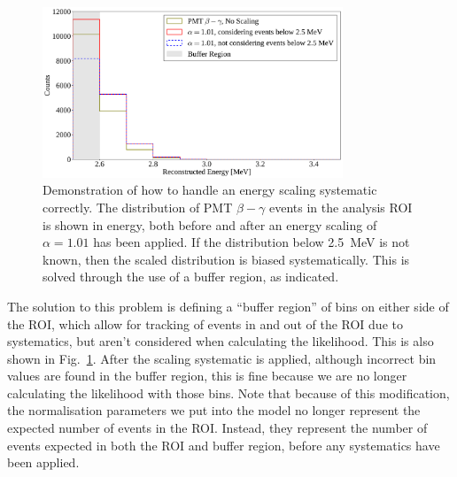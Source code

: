 \begin{figure}
    \centering
    \includegraphics[width=0.8\textwidth]{6_SolarAnalysis/images/buffer_region_demonstration_PMT_beta_gammas.pdf}
    \caption[Demonstration of how to handle an energy scaling systematic correctly]
    {Demonstration of how to handle an energy scaling systematic correctly. The distribution of PMT $\beta-\gamma$ events in the analysis ROI is shown in energy, both before and after an energy scaling of $\alpha = 1.01$ has been applied. If the distribution below \SI{2.5}{\MeV} is not known, then the scaled distribution is biased systematically. This is solved through the use of a buffer region, as indicated.}
    \label{fig:energy_scaling_example}
\end{figure}

The solution to this problem is defining a ``buffer region'' of bins on either side of the ROI, which allow for tracking of events in and out of the ROI due to systematics, but aren't considered when calculating the likelihood. This is also shown in Fig.~\ref{fig:energy_scaling_example}. After the scaling systematic is applied, although incorrect bin values are found in the buffer region, this is fine because we are no longer calculating the likelihood with those bins. Note that because of this modification, the normalisation parameters we put into the model no longer represent the expected number of events in the ROI. Instead, they represent the number of events expected in both the ROI and buffer region, before any systematics have been applied.


